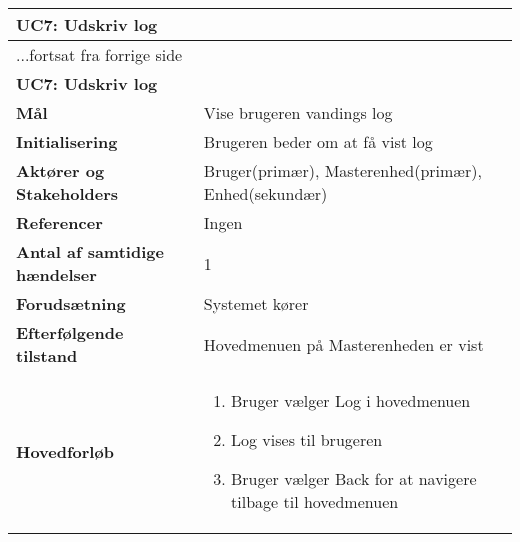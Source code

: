 \begin{center} \centering
	\begin{longtable}{|p{6cm}|p{8cm}|}  %
	\hline
		\multicolumn{2}{|l|}{\textbf{UC7: Udskriv log}} \\\hline %
		\endfirsthead
		
		\multicolumn{2}{l}{...fortsat fra forrige side} \\ \hline %
		\multicolumn{2}{|l|}{\textbf{UC7: Udskriv log}} \\\hline %
		\endhead	
		
		\textbf{Mål}								&Vise brugeren vandings log			\\\hline
		\textbf{Initialisering}					&Brugeren beder om at få vist log			\\\hline
		\textbf{Aktører og Stakeholders}			&Bruger(primær), Masterenhed(primær), Enhed(sekundær)			\\\hline
		\textbf{Referencer}						&Ingen			\\\hline
		\textbf{Antal af samtidige hændelser}	&1			\\\hline
		\textbf{Forudsætning}					&Systemet kører	\\\hline
		\textbf{Efterfølgende tilstand}			&Hovedmenuen på Masterenheden er vist			\\\hline
		\textbf{Hovedforløb}					
			&\begin{enumerate}
	
				\item Bruger vælger Log i hovedmenuen 
				
				\item Log vises til brugeren
				
				\item Bruger vælger Back for at navigere tilbage til hovedmenuen
	
			\end{enumerate}\\\hline
	\end{longtable}
	\label{UC7} 
\end{center}

